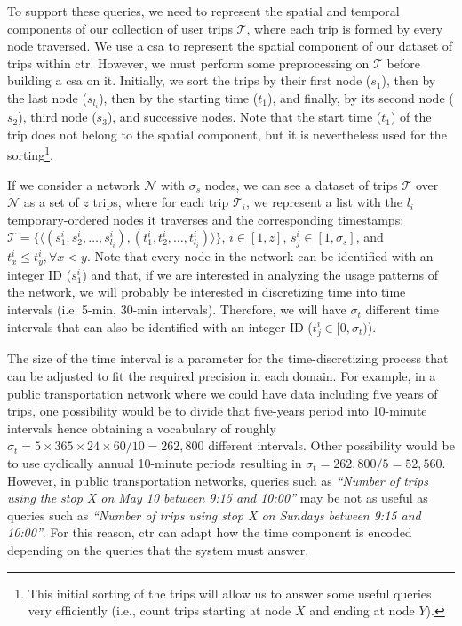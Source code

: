	To support these queries, we need to represent the spatial and temporal components of our collection of user trips $\mathcal{T}$, where each trip is formed by every node traversed. We use a \gls{csa} to represent the spatial component of our dataset of trips within \gls{ctr}. However, we must perform some preprocessing on $\mathcal{T}$ before building a \gls{csa} on it. Initially, we sort the trips by their first node ($s_1$), then by the last node ($s_{l_i}$), then by the starting time ($t_1$), and finally, by its second node ($s_2$), third node ($s_3$), and successive nodes. Note that the start time ($t_1$) of the trip does not belong to the spatial component, but it is nevertheless used for the sorting\footnote{This initial sorting of the trips will allow us to answer some useful queries very efficiently  (i.e., count trips starting at node $X$ and ending at node $Y$).}.

	If we consider a network $\mathcal{N}$ with $\sigma_s$ nodes, 
	we can see a dataset of trips $\mathcal{T}$ over $\mathcal{N}$ as 
	a set of $z$ trips, where for each trip $\mathcal{T}_i$, we represent a list with the $l_i$ 
	temporary-ordered nodes it traverses and the corresponding timestamps: 
	$\mathcal{T}= \{ \langle (s^i_1, s^i_2, \dots,  s^i_{l_i}),(t^i_1, t^i_2, \dots,  t^i_{l_i}) \rangle\}$, $i\in[1,z]$, 
	$s^i_j \in [1,\sigma_s]$, and $t^i_{x} \leq t^i_y, \forall x < y$. 
	Note that every node in the network can be identified with an integer ID ($s^i_1$) and that, if we are interested in
	analyzing the usage patterns of the network, we will probably be interested in discretizing time into 
	time intervals (i.e. 5-min, 30-min intervals). Therefore,
	we will have $\sigma_t$ different time intervals that can also be identified with an
	integer ID ($t^i_j \in [0,\sigma_t)$).

	The size of the time interval is a parameter for the time-discretizing process
	that can be adjusted to fit the required precision in each domain.
	For example, in a public
	transportation network where we could have data including five years of trips, one
	possibility would be to divide that five-years period into
	10-minute intervals hence obtaining a
	vocabulary of roughly $\sigma_t=5\times 365 \times 24 \times 60/10 = 262,800$ different intervals. 
	Other possibility would
	be to use cyclically annual 10-minute periods resulting in $\sigma_t=262,800 / 5 = 52,560$. 
	However,  in public transportation networks, queries such
	as \textit{``Number of trips using the stop X on May 10 between 9:15 and 10:00''} may be not 
	as useful as queries such as \textit{``Number of trips using stop X on Sundays between 9:15 and
		10:00''}.
	For this reason, \gls{ctr} can adapt how the
	time component is encoded depending on the queries that the system must answer.


